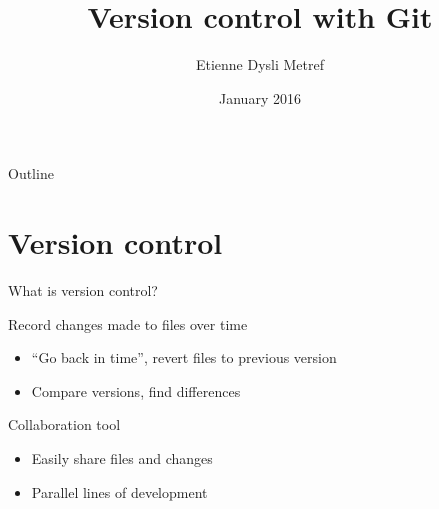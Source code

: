 \documentclass{beamer}
\title{Version control with Git}
\author{Etienne Dysli Metref}
\date{January 2016}
\begin{document}
\begin{frame}
  \titlepage
\end{frame}

\begin{frame}{Outline}
  \tableofcontents[hideallsubsections]
\end{frame}

\section{Version control}
\begin{frame}{What is version control?}
  \begin{block}{Record changes made to files over time}
    \begin{itemize}
    \item ``Go back in time'', revert files to previous version
    \item Compare versions, find differences
    \end{itemize}
  \end{block}
  \begin{block}{Collaboration tool}
    \begin{itemize}
    \item Easily share files and changes
    \item Parallel lines of development
    \end{itemize}
  \end{block}
\end{frame}
\end{document}
